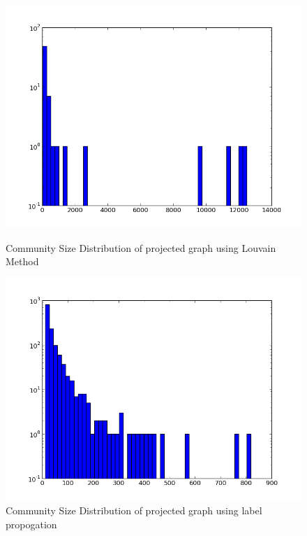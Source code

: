 \documentclass[10pt]{article}
\begin{document}
\begin{figure}[ht]
\includegraphics[scale=.4]{networkx_community_dist.png} 
\caption{Community Size Distribution of projected graph using Louvain Method}
\label{fig:networkx_community_dist}
\endminipage\hfill
{}
\includegraphics[scale=.4]{copra_community_dist.png}
\caption{Community Size Distribution of projected graph using label propogation}
\label{fig:copra_community_dist}
\endminipage\hfill
\end{figure}
\end{document}

